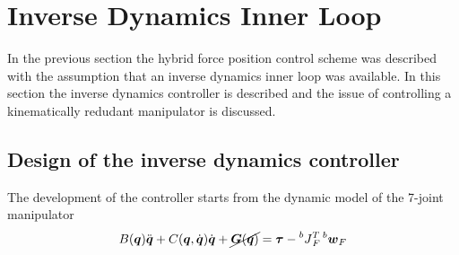 \section{Inverse Dynamics Inner Loop}\label{sec:invdyn}
In the previous section the hybrid force position control scheme was described
with the assumption that an inverse dynamics inner loop was available. In this
section the inverse dynamics controller is described and the issue of controlling
a kinematically redudant manipulator is discussed.

\subsection{Design of the inverse dynamics controller}
The development of the controller starts from the dynamic model of the 7-joint
manipulator
\begin{equation}\label{eq:joint_space_dyn}
  B(\vec{q}) \ddot{\vec{q}} + C(\vec{q}, \dot{\vec{q}}) \dot{\vec{q}} + \cancel{\vec{G}(\vec{q})} = \vec{\tau}
  -\prescript{b}{}{J}^{T}_{F} \prescript{b}{}{\vec{w}}_{F}
\end{equation}

